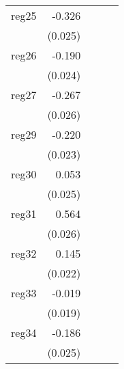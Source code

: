 {\begin{longtable}{l*{4}{D{.}{.}{-1}}}
\addlinespace
reg25       &      -0.326\sym{***}&                     &                     &                     \\
            &     (0.025)         &                     &                     &                     \\
\addlinespace
reg26       &      -0.190\sym{***}&                     &                     &                     \\
            &     (0.024)         &                     &                     &                     \\
\addlinespace
reg27       &      -0.267\sym{***}&                     &                     &                     \\
            &     (0.026)         &                     &                     &                     \\
\addlinespace
reg29       &      -0.220\sym{***}&                     &                     &                     \\
            &     (0.023)         &                     &                     &                     \\
\addlinespace
reg30       &       0.053\sym{*}  &                     &                     &                     \\
            &     (0.025)         &                     &                     &                     \\
\addlinespace
reg31       &       0.564\sym{***}&                     &                     &                     \\
            &     (0.026)         &                     &                     &                     \\
\addlinespace
reg32       &       0.145\sym{***}&                     &                     &                     \\
            &     (0.022)         &                     &                     &                     \\
\addlinespace
reg33       &      -0.019         &                     &                     &                     \\
            &     (0.019)         &                     &                     &                     \\
\addlinespace
reg34       &      -0.186\sym{***}&                     &                     &                     \\
            &     (0.025)         &                     &                     &                     \\

\end{longtable}}
